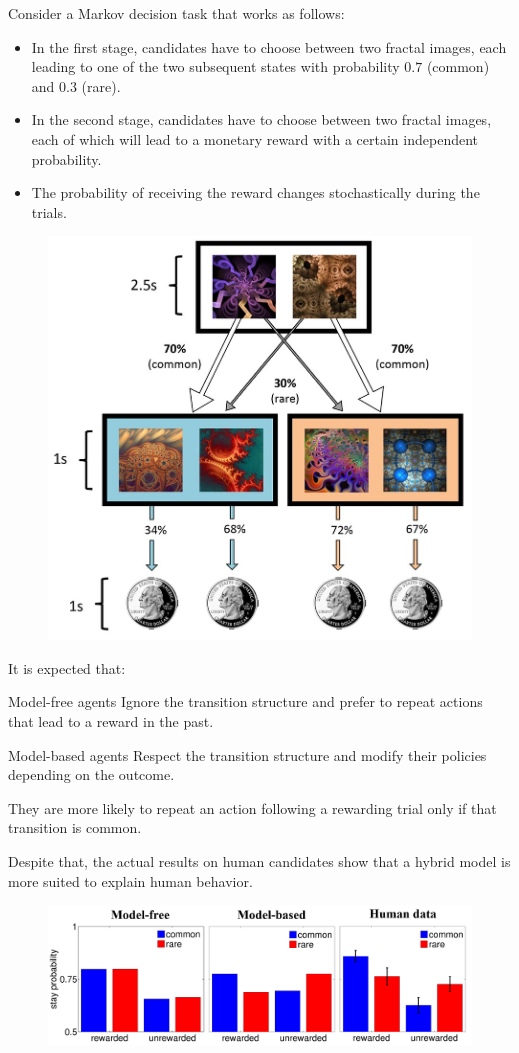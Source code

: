 \begin{casestudy}
    Consider a Markov decision task that works as follows:
    \begin{itemize}
        \item In the first stage, candidates have to choose between two fractal images, 
            each leading to one of the two subsequent states with probability $0.7$ (common) and $0.3$ (rare).
        \item In the second stage, candidates have to choose between two fractal images, 
            each of which will lead to a monetary reward with a certain independent probability.
        \item The probability of receiving the reward changes stochastically during the trials.
    \end{itemize}
    \begin{figure}[H]
        \centering
        \includegraphics[width=0.35\linewidth]{./img/model_free_based_theoretical.png}
    \end{figure}

    It is expected that:
    \begin{descriptionlist}
        \item[Model-free agents] 
            Ignore the transition structure and prefer to repeat actions that lead to a reward in the past.

        \item[Model-based agents] 
            Respect the transition structure and modify their policies depending on the outcome.

            They are more likely to repeat an action following a rewarding trial only if that transition is common.
    \end{descriptionlist}

    Despite that, the actual results on human candidates show that a hybrid model is more suited to explain human behavior.
    \begin{figure}[H]
        \centering
        \includegraphics[width=0.6\linewidth]{./img/human_hybrid_model.png}
    \end{figure}


\end{casestudy}
